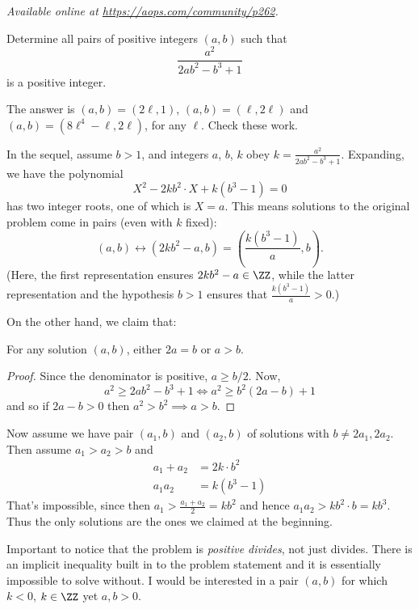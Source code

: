 \textsl{Available online at \url{https://aops.com/community/p262}.}
\begin{mdframed}[style=mdpurplebox,frametitle={Problem statement}]
Determine all pairs of positive integers $(a,b)$ such that
\[ \frac{a^2}{2ab^2-b^3+1} \]
is a positive integer.
\end{mdframed}
The answer is $(a,b) = (2\ell, 1)$, $(a,b) = (\ell, 2\ell)$
and $(a,b) = (8\ell^4-\ell, 2\ell)$, for any $\ell$.
Check these work.

In the sequel, assume $b > 1$,
and integers $a$, $b$, $k$ obey $k = \frac{a^2}{2ab^2-b^3+1}$.
Expanding, we have the polynomial
\[ X^2 - 2kb^2 \cdot X + k(b^3-1) = 0 \]
has two integer roots, one of which is $X = a$.
This means solutions to the original problem come in pairs
(even with $k$ fixed):
\[ (a,b) \longleftrightarrow
  \left( 2kb^2 - a, b\right)
  = \left( \frac{k(b^3-1)}{a}, b\right). \]
(Here, the first representation ensures
$2kb^2-a \in \ZZ$,
while the latter representation and the hypothesis $b > 1$ ensures
that $\frac{k(b^3-1)}{a} > 0$.)

On the other hand, we claim that:
\begin{claim*}
For any solution $(a,b)$,
either $2a = b$ or $a > b$.
\end{claim*}
\begin{proof}
  Since the denominator is positive, $a \ge b/2$.
  Now,
  \[ a^2 \ge 2ab^2 - b^3 + 1 \iff a^2 \ge b^2(2a-b) + 1 \]
  and so if $2a - b > 0$ then $a^2 > b^2 \implies a > b$.
\end{proof}

Now assume we have pair $(a_1, b)$ and $(a_2, b)$
of solutions with $b \neq 2a_1, 2a_2$.
Then assume $a_1 > a_2 > b$ and
\begin{align*}
  a_1 + a_2 &= 2k \cdot b^2 \\
  a_1a_2 &= k(b^3-1)
\end{align*}
That's impossible, since then $a_1 > \frac{a_1+a_2}{2} = k b^2$
and hence $a_1a_2 > kb^2 \cdot b = kb^3$.
Thus the only solutions are the ones we claimed at the beginning.

\begin{remark*}
  Important to notice that the problem is \emph{positive divides},
  not just divides.
  There is an implicit inequality built in to the problem
  statement and it is essentially impossible to solve without.
  I would be interested in a pair $(a,b)$
  for which $k < 0$, $k \in \ZZ$ yet $a, b > 0$.
\end{remark*}
\pagebreak